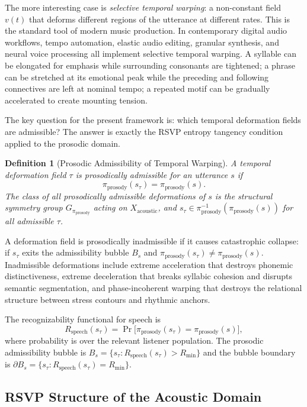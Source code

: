\documentclass[12pt, a4paper]{article}
\theoremstyle{essaystyle}
\newtheorem{definition}{Definition}
\begin{document}
The more interesting case is \emph{selective temporal warping}: a non-constant field
$v(t)$ that deforms different regions of the utterance at different rates. This is the
standard tool of modern music production. In contemporary digital audio workflows,
tempo automation, elastic audio editing, granular synthesis, and neural voice processing
all implement selective temporal warping. A syllable can be elongated for emphasis
while surrounding consonants are tightened; a phrase can be stretched at its emotional
peak while the preceding and following connectives are left at nominal tempo; a repeated
motif can be gradually accelerated to create mounting tension.

The key question for the present framework is: which temporal deformation fields are
admissible? The answer is exactly the RSVP entropy tangency condition applied to the
prosodic domain.

\begin{definition}[Prosodic Admissibility of Temporal Warping]
A temporal deformation field $\tau$ is \emph{prosodically admissible} for an utterance
$s$ if
\[
\pi_{\mathrm{prosody}}(s_\tau) = \pi_{\mathrm{prosody}}(s).
\]
The class of all prosodically admissible deformations of $s$ is the structural symmetry
group $G_{\pi_{\mathrm{prosody}}}$ acting on $X_{\mathrm{acoustic}}$, and
$s_\tau \in \pi_{\mathrm{prosody}}^{-1}(\pi_{\mathrm{prosody}}(s))$ for all admissible $\tau$.
\end{definition}

A deformation field is prosodically inadmissible if it causes catastrophic collapse:
if $s_\tau$ exits the admissibility bubble $B_s$ and $\pi_{\mathrm{prosody}}(s_\tau)
\neq \pi_{\mathrm{prosody}}(s)$. Inadmissible deformations include extreme acceleration
that destroys phonemic distinctiveness, extreme deceleration that breaks syllabic
cohesion and disrupts semantic segmentation, and phase-incoherent warping that
destroys the relational structure between stress contours and rhythmic anchors.

The recognizability functional for speech is
\[
R_{\mathrm{speech}}(s_\tau)
= \Pr\bigl[\pi_{\mathrm{prosody}}(s_\tau) = \pi_{\mathrm{prosody}}(s)\bigr],
\]
where probability is over the relevant listener population. The prosodic admissibility
bubble is $B_s = \{s_\tau : R_{\mathrm{speech}}(s_\tau) > R_{\min}\}$ and the bubble
boundary is $\partial B_s = \{s_\tau : R_{\mathrm{speech}}(s_\tau) = R_{\min}\}$.

\subsection{RSVP Structure of the Acoustic Domain}
\end{document}
